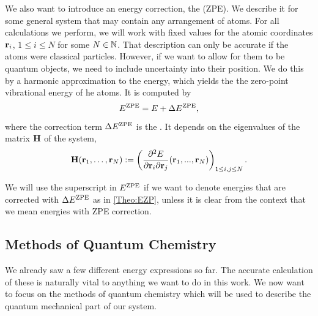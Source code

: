 \documentclass[8.5pt,twoside,twocolumn]{article}
\newcommand\zpe{\enmat{\te{ZPE}}}
\newcommand\ezp{\enmat{E^{\zpe}}}
\renewcommand\H{\enmat{\bo H}}
\renewcommand\r{\bo r}
\theoremstyle{standard}
\begin{document}
We also want to introduce an energy correction, the  (ZPE).
We describe it for some general system that may contain any arrangement of atoms.
For all calculations we perform, we will work with fixed values for the atomic
coordinates $\r_i$, $1 \le i \le N$ for some $N \in \mathbb{N}$. That description can only be accurate if
the atoms were classical particles. However, if we want to allow for them to be
quantum objects, we need to include uncertainty into their position. We do
this by a harmonic approximation to the energy, which yields the
the zero-point vibrational energy of he atoms. It is computed by
\begin{equation}
 \ezp=E + \Dl \ezp,
 \label{Theo:EZP}
\end{equation}
where the correction term $\Dl \ezp$ is the . It depends on the eigenvalues of the  matrix $\H$ of
the system,
\begin{equation}
 \H(\r_1,\ldots,\r_N) := \rb{\deri {^2 E} {\r_i \del \r_j} (\r_1,...,\r_N)
 }_{1\le i,j \le N}.
 \label{Theo:Hessian}
\end{equation}

We will use the superscript in $\ezp$ if we want to denote energies that are corrected 
with $\Dl \ezp$ as in \eqref{Theo:EZP}, unless it is clear from the
context that we mean energies with ZPE correction.

\subsection{Methods of Quantum Chemistry}
\label{Sec:Theo:QMMet}

We already saw a few different energy expressions so far. The accurate
calculation of these is naturally vital to anything we want to do in this work.
We now want to focus on the methods of quantum chemistry which will be used to
describe the quantum mechanical part of our system.
\end{document}
